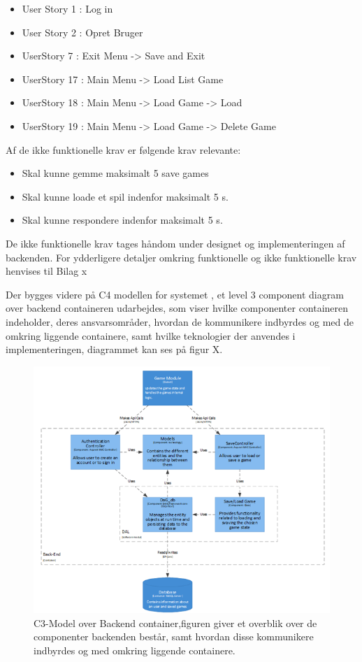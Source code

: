 \begin{itemize}
\item User Story 1 : Log in
\item User Story 2 : Opret Bruger
\item UserStory 7 : Exit Menu -> Save and Exit
\item UserStory 17 : Main Menu -> Load List Game
\item UserStory 18 : Main Menu -> Load Game -> Load
\item UserStory 19 : Main Menu -> Load Game -> Delete Game
\end{itemize}
Af de ikke funktionelle krav er følgende krav relevante:
\begin{itemize}
\item Skal kunne gemme maksimalt 5 save games
\item Skal kunne loade et spil indenfor maksimalt 5 s.
\item Skal kunne respondere indenfor maksimalt 5 s.
\end{itemize}
De ikke funktionelle krav tages håndom under designet og implementeringen af backenden.
For ydderligere detaljer omkring funktionelle og ikke funktionelle krav henvises til Bilag x


Der bygges videre på C4 modellen for systemet , et level 3 component diagram over backend containeren udarbejdes, som viser hvilke componenter containeren indeholder, deres ansvarsområder, hvordan de kommunikere indbyrdes og med de omkring liggende containere, samt hvilke teknologier der anvendes i implementeringen, diagrammet kan ses på figur X. 


\begin{figure}[H]
\centering
\includegraphics[width = \textwidth]{02-Body/Images/Backend_C3.PNG}
\caption{C3-Model over Backend container,figuren giver et overblik over de componenter backenden består, samt hvordan disse kommunikere indbyrdes og med omkring liggende containere.}
\label{fig:Arkitektur-Backend-C3}
\end{figure}

